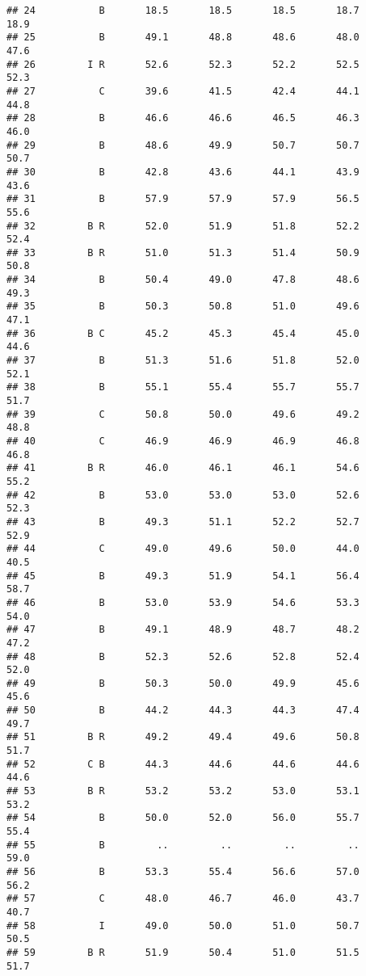 \documentclass[]{article}
\begin{document}
\begin{verbatim}
## 24           B       18.5       18.5       18.5       18.7       18.9
## 25           B       49.1       48.8       48.6       48.0       47.6
## 26         I R       52.6       52.3       52.2       52.5       52.3
## 27           C       39.6       41.5       42.4       44.1       44.8
## 28           B       46.6       46.6       46.5       46.3       46.0
## 29           B       48.6       49.9       50.7       50.7       50.7
## 30           B       42.8       43.6       44.1       43.9       43.6
## 31           B       57.9       57.9       57.9       56.5       55.6
## 32         B R       52.0       51.9       51.8       52.2       52.4
## 33         B R       51.0       51.3       51.4       50.9       50.8
## 34           B       50.4       49.0       47.8       48.6       49.3
## 35           B       50.3       50.8       51.0       49.6       47.1
## 36         B C       45.2       45.3       45.4       45.0       44.6
## 37           B       51.3       51.6       51.8       52.0       52.1
## 38           B       55.1       55.4       55.7       55.7       51.7
## 39           C       50.8       50.0       49.6       49.2       48.8
## 40           C       46.9       46.9       46.9       46.8       46.8
## 41         B R       46.0       46.1       46.1       54.6       55.2
## 42           B       53.0       53.0       53.0       52.6       52.3
## 43           B       49.3       51.1       52.2       52.7       52.9
## 44           C       49.0       49.6       50.0       44.0       40.5
## 45           B       49.3       51.9       54.1       56.4       58.7
## 46           B       53.0       53.9       54.6       53.3       54.0
## 47           B       49.1       48.9       48.7       48.2       47.2
## 48           B       52.3       52.6       52.8       52.4       52.0
## 49           B       50.3       50.0       49.9       45.6       45.6
## 50           B       44.2       44.3       44.3       47.4       49.7
## 51         B R       49.2       49.4       49.6       50.8       51.7
## 52         C B       44.3       44.6       44.6       44.6       44.6
## 53         B R       53.2       53.2       53.0       53.1       53.2
## 54           B       50.0       52.0       56.0       55.7       55.4
## 55           B         ..         ..         ..         ..       59.0
## 56           B       53.3       55.4       56.6       57.0       56.2
## 57           C       48.0       46.7       46.0       43.7       40.7
## 58           I       49.0       50.0       51.0       50.7       50.5
## 59         B R       51.9       50.4       51.0       51.5       51.7

\end{verbatim}
\end{document}
